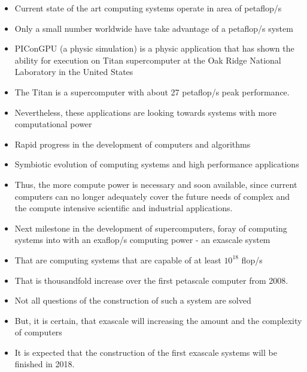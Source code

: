 \begin{itemize}

\item Current state of the art computing systems operate in area of
  petaflop/s
\item Only a small number worldwide have take advantage of a
  petaflop/s system
\item PIConGPU (a physic simulation) is a physic application that has
  shown the ability for execution on Titan supercomputer at the Oak
  Ridge National Laboratory in the United States
\item The Titan is a supercomputer with about 27 petaflop/s peak
  performance.
\item Nevertheless, these applications are looking towards systems
  with more computational power

\item Rapid progress in the development of computers and algorithms
\item Symbiotic evolution of computing systems and high performance
  applications
\item Thus, the more compute power is necessary and soon available,
  since current computers can no longer adequately cover the future
  needs of complex and the compute intensive scientific and industrial
  applications.
\item Next milestone in the development of supercomputers, foray of
  computing systems into with an exaflop/s computing power - an
  exascale system
\item That are computing systems that are capable of at least
  $10^{18}$ flop/s
\item That is thousandfold increase over the first petascale computer
  from 2008.
\item Not all questions of the construction of such a system are
  solved
\item But, it is certain, that exascale will increasing the amount and
  the complexity of computers
\item It is expected that the construction of the first exascale
  systems will be finished in 2018.


\end{itemize}
